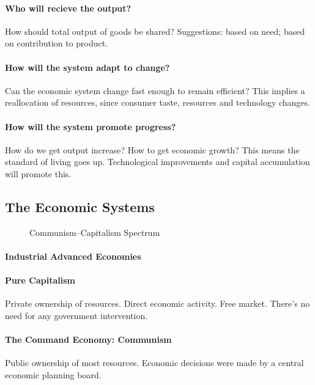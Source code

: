 \paragraph{Who will recieve the output?} How should total output of goods be shared? Suggestions: based on need; based on contribution to product.

\paragraph{How will the system adapt to change?} Can the economic system change fast enough to remain efficient? This implies a reallocation of resources, since consumer taste, resources and technology changes.

\paragraph{How will the system promote progress?} How do we get output increase? How to get economic growth? This means the standard of living goes up. Technological improvements and capital accumulation will promote this.

\subsection{The Economic Systems}

\begin{figure}[ht]
    \centering
    \caption{Communism--Capitalism Spectrum}
    \label{fig:communism-capitalism-spectrum}
\end{figure}

\paragraph{Industrial Advanced Economies}

\paragraph{Pure Capitalism} Private ownership of resources. Direct economic activity. Free market. There's no need for any government intervention.

\paragraph{The Command Economy: Communism} Public ownership of most resources. Economic decisions were made by a central economic planning board. 


